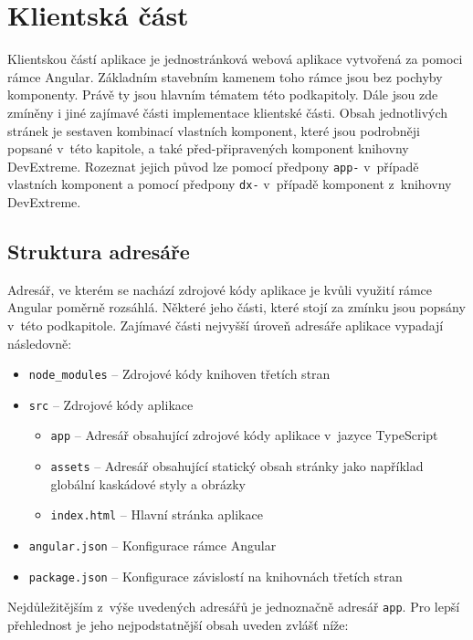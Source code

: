 \section{Klientská část}
Klientskou částí aplikace je jednostránková webová aplikace vytvořená za pomoci rámce Angular. Základním stavebním kamenem toho rámce jsou bez pochyby komponenty. Právě ty jsou hlavním tématem této podkapitoly. Dále jsou zde zmíněny i jiné zajímavé části implementace klientské části. Obsah jednotlivých stránek je sestaven kombinací vlastních komponent, které jsou podrobněji popsané v~této kapitole, a také před-připravených komponent knihovny DevExtreme. Rozeznat jejich původ lze pomocí předpony \texttt{app-} v~případě vlastních komponent a pomocí předpony \texttt{dx-} v~případě komponent z~knihovny DevExtreme.


\subsection{Struktura adresáře}
Adresář, ve kterém se nachází zdrojové kódy aplikace je kvůli využití rámce Angular poměrně rozsáhlá. Některé jeho části, které stojí za zmínku jsou popsány v~této podkapitole. Zajímavé části nejvyšší úroveň adresáře aplikace vypadají následovně:

\begin{itemize}
  \item \texttt{node\_modules} -- Zdrojové kódy knihoven třetích stran
  \item \texttt{src} -- Zdrojové kódy aplikace
  \begin{itemize}
    \item \texttt{app} -- Adresář obsahující zdrojové kódy aplikace v~jazyce TypeScript
     \item \texttt{assets} -- Adresář obsahující statický obsah stránky jako například globální kaskádové styly a obrázky
     \item \texttt{index.html} -- Hlavní stránka aplikace
  \end{itemize}
  \item \texttt{angular.json} -- Konfigurace rámce Angular
  \item \texttt{package.json} -- Konfigurace závislostí na knihovnách třetích stran
\end{itemize}

Nejdůležitějším z~výše uvedených adresářů je jednoznačně adresář \texttt{app}. Pro lepší přehlednost je jeho nejpodstatnější obsah uveden zvlášť níže:

